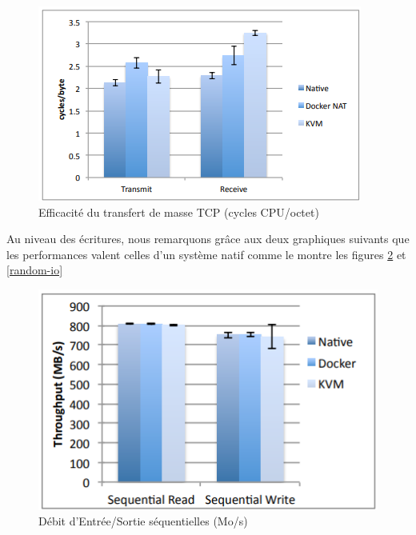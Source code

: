 \documentclass[
    iai, %
    il, %
]{heig-tb}
\begin{document}
\begin{center}
    \begin{figure}[H]
        \includegraphics[width=\textwidth]{./assets/figures/docker-perf-transfer-efficiancy.png}
        \caption[Docker efficacité du transfert de masse]{Efficacité du transfert de masse TCP (cycles CPU/octet) \cite{rad2017introduction} \label{tcp-transfer-latency}}
    \end{figure}
\end{center}

Au niveau des écritures, nous remarquons grâce aux deux graphiques suivants que les performances valent
celles d'un système natif comme le montre les figures \ref{sequential-io} et \ref{random-io}

\begin{center}
    \begin{figure}[H]
        \includegraphics[width=\textwidth]{./assets/figures/docker-perf-sequential-io.png}
        \caption[Docker débit d'I/O séquentielles]{Débit d'Entrée/Sortie séquentielles (Mo/s) \cite{rad2017introduction} \label{sequential-io}}
    \end{figure}
\end{center}
\end{document}
